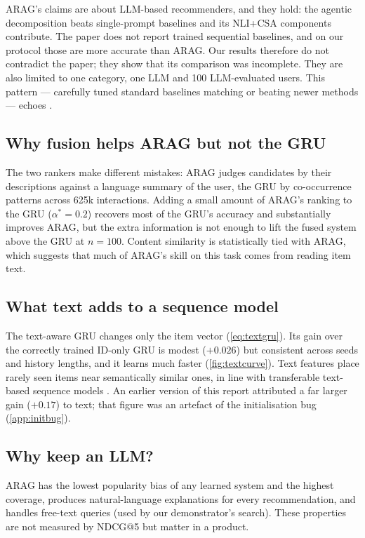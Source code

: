 \documentclass[11pt,a4paper]{article}
\begin{document}
ARAG's claims are about LLM-based recommenders, and they hold: the agentic decomposition beats
single-prompt baselines and its NLI+CSA components contribute. The paper does not report trained
sequential baselines, and on our protocol those are more accurate than ARAG. Our results therefore
do not contradict the paper; they show that its comparison was incomplete. They are also limited
to one category, one LLM and 100 LLM-evaluated users. This pattern --- carefully tuned standard
baselines matching or beating newer methods --- echoes \citet{dacrema2019really}.

\subsection{Why fusion helps ARAG but not the GRU}

The two rankers make different mistakes: ARAG judges candidates by their descriptions against a
language summary of the user, the GRU by co-occurrence patterns across 625k interactions. Adding a
small amount of ARAG's ranking to the GRU ($\alpha^*=0.2$) recovers most of the GRU's accuracy and
substantially improves ARAG, but the extra information is not enough to lift the fused system above
the GRU at $n=100$. Content similarity is statistically tied with ARAG, which suggests that much of
ARAG's skill on this task comes from reading item text.

\subsection{What text adds to a sequence model}
\label{sec:disc-representation}

The text-aware GRU changes only the item vector (\cref{eq:textgru}). Its gain over the correctly
trained ID-only GRU is modest ($+0.026$) but consistent across seeds and history lengths, and it
learns much faster (\cref{fig:textcurve}). Text features place rarely seen items near semantically
similar ones, in line with transferable text-based sequence models \citep{hou2022unisrec}. An
earlier version of this report attributed a far larger gain ($+0.17$) to text; that figure was an
artefact of the initialisation bug (\cref{app:initbug}).

\subsection{Why keep an LLM?}

ARAG has the lowest popularity bias of any learned system and the highest coverage, produces
natural-language explanations for every recommendation, and handles free-text queries (used by our
demonstrator's search). These properties are not measured by NDCG@5 but matter in a product.
\end{document}

